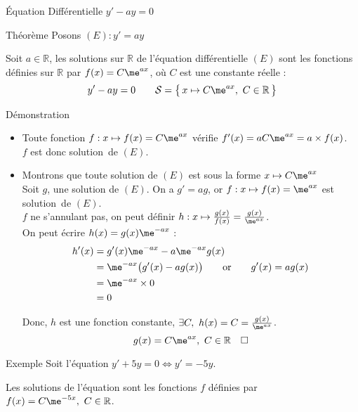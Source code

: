 \documentclass{cours}
\begin{document}
    \begin{Gpartie}{Équation Différentielle $y'-ay=0$} 
        \begin{Spartie}{Théorème} 
            Posons $(E) : y'=ay$

            Soit $a\in\mathbb{R}$, les solutions sur $\mathbb{R}$ de l'équation différentielle $(E)$ sont les fonctions définies sur $\mathbb{R}$ par $f(x)=C\me^{ax}$, où $C$ est une constante réelle :
            \[y'-ay=0\qquad\mathcal{S}=\big\{\,x\mapsto C\me^{ax},~C\in\mathbb{R}\,\big\}\]

            \begin{SSpartie}{Démonstration} 
                \begin{itemize}
                    \item Toute fonction $f:x\mapsto f(x)=C\me^{ax}$ vérifie $f'(x)=aC\me^{ax}=a\times f(x)$. \\ $f$ est donc solution~de $(E)$.
                    \item Montrons que toute solution de $(E)$ est sous la forme $x\mapsto C\me^{ax}$ \\
                    Soit $g$, une solution de $(E)$. On a $g'=ag$, or $f:x\mapsto f(x)=\me^{ax}$ est solution~de $(E)$. \\
                    $f$ ne s'annulant pas, on peut définir $h:x\mapsto \frac{g(x)}{f(x)}=\frac{g(x)}{\me^{ax}}$. \\
                    On peut écrire $h(x)=g(x)\me^{-ax}$ :
                    \[\begin{aligned}[t]
                        h'(x)&=g'(x)\me^{-ax}-a\me^{-ax}g(x) \\
                        &=\me^{-ax}\big(g'(x)-ag(x)\big)\qquad\text{or}\qquad g'(x)=ag(x) \\
                        &=\me^{-ax}\times 0 \\
                        &=0
                    \end{aligned}\]

                    Donc, $h$ est une fonction constante, $\exists C,~h(x)=C=\frac{g(x)}{\me^{ax}}$.
                    \[g(x)=C\me^{ax},~C\in\mathbb{R}\quad\square\]
                \end{itemize}
            \end{SSpartie}
            \begin{Spartie}{Exemple} 
                Soit l'équation $y'+5y=0\iff y'=-5y$.

                Les solutions de l'équation sont les fonctions $f$ définies par $f(x)=C\me^{-5x},\ C\in\mathbb{R}$.
            \end{Spartie}
        \end{Spartie}
    \end{Gpartie}
\end{document}
